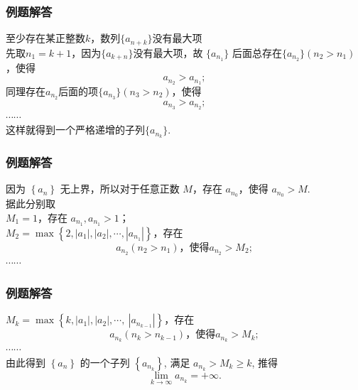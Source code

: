 \documentclass[mathserif]{beamer}
\begin{document}
\begin{frame}
	\frametitle{例题解答\hfill \hyperlink{li_5<1>}{}}
	\begin{proofs}
		\suojin {} 至少存在某正整数$k$，数列$\{a_{n+k}\}$没有最大项\jh \\
		\suojin 先取$n_{1}=k+1$，因为$\{a_{k+n}\}$没有最大项，故 $\{a_{n_{1}}\}$ 后面总存在$\{a_{n_{2}}\}(n_{2}>n_{1})$，使得$$a_{n_{2}}>a_{n_{1}};$$
		\suojin 同理存在$a_{n_{2}}$后面的项$\{a_{n_{3}}\}(n_{3}>n_{2})$，使得$$a_{n_{3}}>a_{n_{2}};$$
		\suojin $\cdots\cdots$\\
		\suojin 这样就得到一个严格递增的子列$\{a_{n_k}\}$.
	\end{proofs}
\end{frame}






\begin{frame}[label=li_6jd]
	\frametitle{例题解答\hfill \hyperlink{li_6<1>}{}}
	\begin{proofs}
		\suojin 因为 $\left\{a_n\right\}$ 无上界，所以对于任意正数 $M$，存在 $a_{n_0}$，使得 $a_{n_0}>M$. \\
		\suojin 据此分别取 \\
		\suojin $M_1=1$，存在 $a_{n_1}, a_{n_1}>1$；\\
		\suojin $M_2=\max \left\{2,\left|a_1\right|,\left|a_2\right|, \cdots,\left|a_{n_1}\right|\right\}$，存在 
		$$a_{n_2}\left(n_2>n_1\right)\text{，使得} a_{n_2}>M_2;$$
		\suojin $\cdots\cdots$
	\end{proofs}
\end{frame}



\begin{frame}[label=li_6jd]
	\frametitle{例题解答\hfill \hyperlink{li_6<1>}{}}
	\begin{proofs}
		\suojin $M_k=\max \left\{k,\left|a_1\right|,\left|a_2\right|, \cdots,\ \left|a_{n_{k-1}}\right|\right\}$，存在 
		$$a_{n_k}\left(n_k>n_{k-1}\right)\text{，使得} a_{n_k}>M_k;$$
		\suojin $\cdots\cdots$\\
		\suojin 由此得到 $\left\{a_n\right\}$ 的一个子列 $\left\{a_{n_k}\right\}$, 满足 $a_{n_k}>M_k \geqslant k$, 推得
		$$
		\lim _{k \rightarrow \infty} a_{n_k}=+\infty .
		$$
	\end{proofs}
\end{frame}
\end{document}
